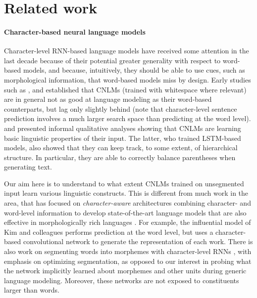 \section{Related work}
\label{sec:related}

\paragraph{Character-based neural language models} Character-level
RNN-based language models have received some attention in the last
decade because of their potential greater generality with respect to
word-based models, and because, intuitively, they should be able to
use cues, such as morphological information, that word-based models
miss by design. Early studies such as ,
 and  established
that CNLMs (trained with whitespace where relevant) are in general not
as good at language modeling as their word-based counterparts, but lag
only slightly behind (note that character-level sentence prediction
involves a much larger search space than predicting at the word
level).  and 
presented informal qualitative analyses showing that CNLMs are
learning basic linguistic properties of their input. The latter, who
trained LSTM-based models, also showed that they can keep track, to
some extent, of hierarchical structure. In particular, they are able
to correctly balance parentheses when generating text.

Our aim here is to understand to what extent CNLMs trained on
unsegmented input learn various linguistic constructs. This is
different from much work in the area, that has focused on
\emph{character-aware} architectures combining character- and
word-level information to develop state-of-the-art language models
that are also effective in morphologically rich languages \citep[see,
e.g.,][and references
there]{Bojanowski:etal:2016,Kim:etal:2016,Gerz:etal:2018}. For
example, the influential model of Kim and colleagues performs
prediction at the word level, but uses a character-based convolutional
network to generate the representation of each work. There is also
work on segmenting words into morphemes with character-level RNNs
\cite{Kann:etal:2016}, with emphasis on optimizing segmentation, as
opposed to our interest in probing what the network implicitly learned
about morphemes and other units during generic language
modeling. Moreover, these networks are not exposed to constituents
larger than words.


